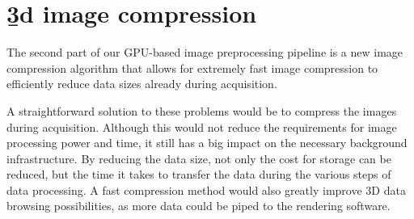 






  
\section{\b3d image compression}

  The second part of our GPU-based image preprocessing pipeline is a new image compression algorithm that allows for extremely fast image compression to efficiently reduce data sizes already during acquisition.
  
  

  A straightforward solution to these problems would be to compress the images during acquisition. Although this would not reduce the requirements for image processing power and time, it still has a big impact on the necessary background infrastructure. By reducing the data size, not only the cost for storage can be reduced, but the time it takes to transfer the data during the various steps of data processing. A fast compression method would also greatly improve 3D data browsing possibilities, as more data could be piped to the rendering software.


